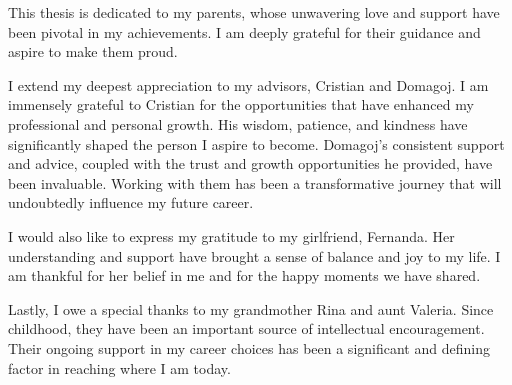This thesis is dedicated to my parents, whose unwavering love and support have
been pivotal in my achievements. I am deeply grateful for their guidance and
aspire to make them proud.

I extend my deepest appreciation to my advisors, Cristian and Domagoj. I am
immensely grateful to Cristian for the opportunities that have enhanced my
professional and personal growth. His wisdom, patience, and kindness have
significantly shaped the person I aspire to become. Domagoj's consistent support
and advice, coupled with the trust and growth opportunities he provided, have
been invaluable. Working with them has been a transformative journey that will
undoubtedly influence my future career.

I would also like to express my gratitude to my girlfriend, Fernanda. Her
understanding and support have brought a sense of balance and joy to my life. I
am thankful for her belief in me and for the happy moments we have shared.

Lastly, I owe a special thanks to my grandmother Rina and aunt Valeria. Since
childhood, they have been an important source of intellectual encouragement.
Their ongoing support in my career choices has been a significant and defining
factor in reaching where I am today.